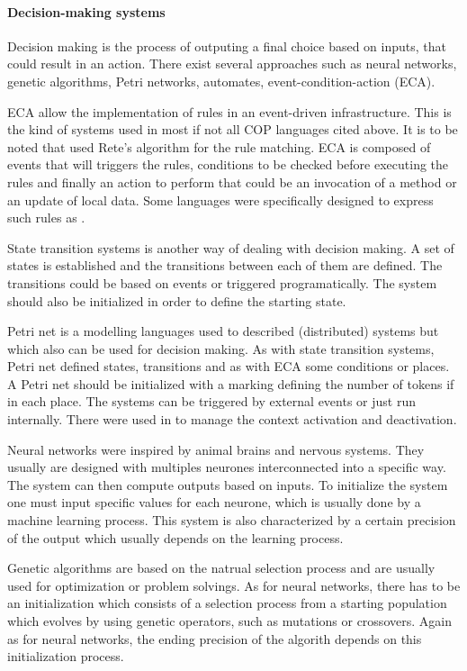 \documentclass[a4paper]{article}
\begin{document}
\paragraph{Decision-making systems}
Decision making is the process of outputing a final choice based on inputs, that could result in an action. There exist several approaches such as neural networks, genetic algorithms, Petri networks, automates, event-condition-action (ECA).

ECA allow the implementation of rules in an event-driven infrastructure. This is the kind of systems used in most if not all COP languages cited above. It is to be noted that \cite{jayaram_context-oriented_2009} used Rete's algorithm for the rule matching. ECA is composed of events that will triggers the rules, conditions to be checked before executing the rules and finally an action to perform that could be an invocation of a method or an update of local data. Some languages were specifically designed to express such rules as \cite{alferes_event-condition-action_2006}.

State transition systems is another  way of dealing with decision making. A set of states is established and the transitions between each of them are defined. The transitions could be based on events or triggered programatically. The system should also be initialized in order to define the starting state.

Petri net is a modelling languages used to described (distributed) systems but which also can be used for decision making. As with state transition systems, Petri net defined states, transitions and as with ECA some conditions or places. A Petri net should be initialized with a marking defining the number of tokens if in each place. The systems can be triggered by external events or just run internally. There were used in \cite{cardozo_uniting_2012} to manage the context activation and deactivation.

Neural networks were inspired by animal brains and nervous systems. They usually are designed with multiples neurones interconnected into a specific way. The system can then compute outputs based on inputs. To initialize the system one must input specific values for each neurone, which is usually done by a machine learning process. This system is also characterized by a certain precision of the output which usually depends on the learning process.

Genetic algorithms are based on the natrual selection process and are usually used for optimization or problem solvings. As for neural networks, there has to be an initialization which consists of a selection process from a starting population which evolves by using genetic operators, such as mutations or crossovers. Again as for neural networks, the ending precision of the algorith depends on this initialization process.
\end{document}
